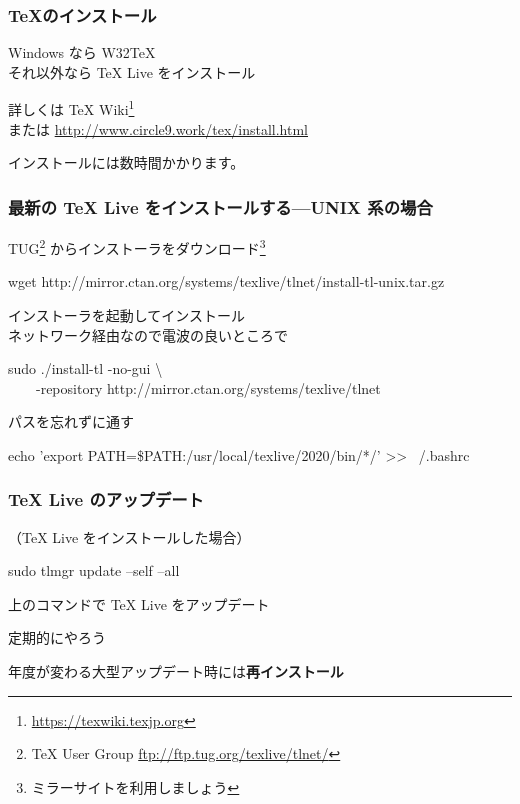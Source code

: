 \documentclass[aspectratio=149,10pt,t,]{beamer}
\newcommand{\nishikifont}{\nishikifonta\nishikifontj}
\newcommand{\hmemph}[1]{\textbf{#1}}
\begin{document}
\frame[c]{\section{\TeX のインストール} {\nishikifont 🖳 美文書 付録 A 🖳}}

\begin{frame}
	\frametitle{\TeX のインストール}
	Windows なら W32TeX\\
	それ以外なら {\TeX} Live をインストール
	
	詳しくは {\TeX} Wiki\footnote{\url{https://texwiki.texjp.org}}\\
	または \url{http://www.circle9.work/tex/install.html}
	
	インストールには数時間かかります。
\end{frame}

\begin{frame}
	\frametitle{最新の {\TeX} Live をインストールする---UNIX 系の場合}
	TUG\footnote{{\TeX} User Group \url{ftp://ftp.tug.org/texlive/tlnet/}}
	からインストーラをダウンロード\footnote{ミラーサイトを利用しましょう}
	\begin{typecmdbox}
		{\scriptsize wget http://mirror.ctan.org/systems/texlive/tlnet/install-tl-unix.tar.gz}
	\end{typecmdbox}
	インストーラを起動してインストール\\
	{\small ネットワーク経由なので電波の良いところで}
	\begin{typecmdbox}
		{\scriptsize sudo ./install-tl -no-gui \textbackslash\\
		~~~~-repository http://mirror.ctan.org/systems/texlive/tlnet}
	\end{typecmdbox}
	
	パスを忘れずに通す
	\begin{typecmdbox}
		\scriptsize echo 'export PATH=\$PATH:/usr/local/texlive/2020/bin/*/' >> ~/.bashrc
	\end{typecmdbox}
\end{frame}

\begin{frame}
	\frametitle{{\TeX} Live のアップデート}
	（{\TeX} Live をインストールした場合）
	
	\begin{typecmdbox}
		sudo tlmgr update --self --all
	\end{typecmdbox}
	
	上のコマンドで {\TeX} Live をアップデート
	
	定期的にやろう
	
	年度が変わる大型アップデート時には\hmemph{再インストール}
\end{frame}
\end{document}
